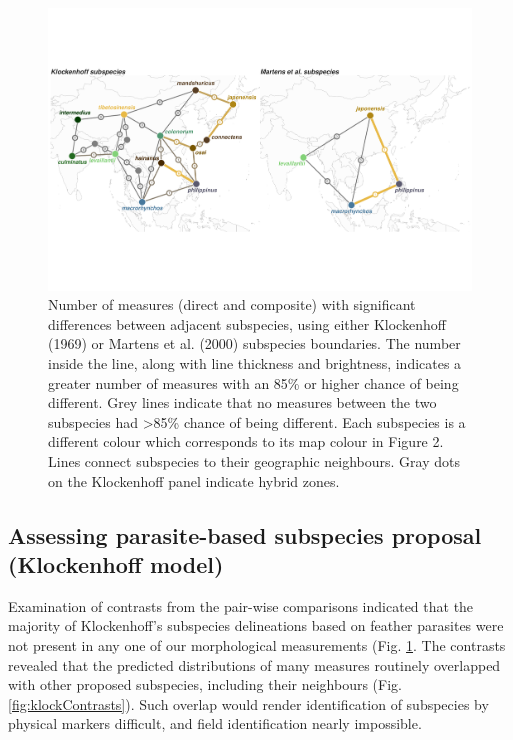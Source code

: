 \documentclass[10pt,a4paper]{article}
\begin{document}
\begin{figure}
\includegraphics[width=0.9\linewidth]{../Figures/combined Subspecies Difference Plot} \caption{Number of measures (direct and composite) with significant differences between adjacent subspecies, using either Klockenhoff (1969) or Martens et al. (2000) subspecies boundaries. The number inside the line, along with line thickness and brightness, indicates a greater number of measures with an 85\% or higher chance of being different. Grey lines indicate that no measures between the two subspecies had >85\% chance of being different. Each subspecies is a different colour which corresponds to its map colour in Figure 2. Lines connect subspecies to their geographic neighbours. Gray dots on the Klockenhoff panel indicate hybrid zones.}\label{fig:countOfDifferencesPlot}
\end{figure}

\subsection{Assessing parasite-based subspecies proposal (Klockenhoff model)}\label{assessing-parasite-based-subspecies-proposal-klockenhoff-model}

Examination of contrasts from the pair-wise comparisons indicated that the majority of Klockenhoff's subspecies delineations based on feather parasites were not present in any one of our morphological measurements (Fig. \ref{fig:countOfDifferencesPlot}.
The contrasts revealed that the predicted distributions of many measures routinely overlapped with other proposed subspecies, including their neighbours (Fig. \ref{fig:klockContrasts}).
Such overlap would render identification of subspecies by physical markers difficult, and field identification nearly impossible.
\end{document}
